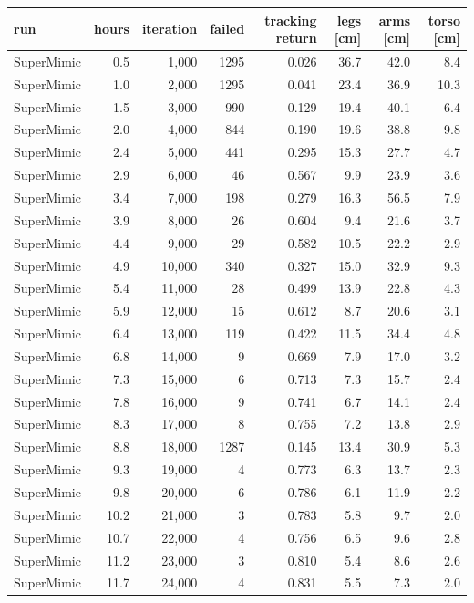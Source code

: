 \begin{tabular}{lrrrrrrr}\toprule
run & hours & iteration & failed & tracking return & legs [cm] & arms [cm] & torso [cm] \\\midrule
SuperMimic & 0.5 & 1,000 & 1295 & 0.026 & 36.7 & 42.0 & 8.4 \\
SuperMimic & 1.0 & 2,000 & 1295 & 0.041 & 23.4 & 36.9 & 10.3 \\
SuperMimic & 1.5 & 3,000 & 990 & 0.129 & 19.4 & 40.1 & 6.4 \\
SuperMimic & 2.0 & 4,000 & 844 & 0.190 & 19.6 & 38.8 & 9.8 \\
SuperMimic & 2.4 & 5,000 & 441 & 0.295 & 15.3 & 27.7 & 4.7 \\
SuperMimic & 2.9 & 6,000 & 46 & 0.567 & 9.9 & 23.9 & 3.6 \\
SuperMimic & 3.4 & 7,000 & 198 & 0.279 & 16.3 & 56.5 & 7.9 \\
SuperMimic & 3.9 & 8,000 & 26 & 0.604 & 9.4 & 21.6 & 3.7 \\
SuperMimic & 4.4 & 9,000 & 29 & 0.582 & 10.5 & 22.2 & 2.9 \\
SuperMimic & 4.9 & 10,000 & 340 & 0.327 & 15.0 & 32.9 & 9.3 \\
SuperMimic & 5.4 & 11,000 & 28 & 0.499 & 13.9 & 22.8 & 4.3 \\
SuperMimic & 5.9 & 12,000 & 15 & 0.612 & 8.7 & 20.6 & 3.1 \\
SuperMimic & 6.4 & 13,000 & 119 & 0.422 & 11.5 & 34.4 & 4.8 \\
SuperMimic & 6.8 & 14,000 & 9 & 0.669 & 7.9 & 17.0 & 3.2 \\
SuperMimic & 7.3 & 15,000 & 6 & 0.713 & 7.3 & 15.7 & 2.4 \\
SuperMimic & 7.8 & 16,000 & 9 & 0.741 & 6.7 & 14.1 & 2.4 \\
SuperMimic & 8.3 & 17,000 & 8 & 0.755 & 7.2 & 13.8 & 2.9 \\
SuperMimic & 8.8 & 18,000 & 1287 & 0.145 & 13.4 & 30.9 & 5.3 \\
SuperMimic & 9.3 & 19,000 & 4 & 0.773 & 6.3 & 13.7 & 2.3 \\
SuperMimic & 9.8 & 20,000 & 6 & 0.786 & 6.1 & 11.9 & 2.2 \\
SuperMimic & 10.2 & 21,000 & 3 & 0.783 & 5.8 & 9.7 & 2.0 \\
SuperMimic & 10.7 & 22,000 & 4 & 0.756 & 6.5 & 9.6 & 2.8 \\
SuperMimic & 11.2 & 23,000 & 3 & 0.810 & 5.4 & 8.6 & 2.6 \\
SuperMimic & 11.7 & 24,000 & 4 & 0.831 & 5.5 & 7.3 & 2.0 \\

\end{tabular}
